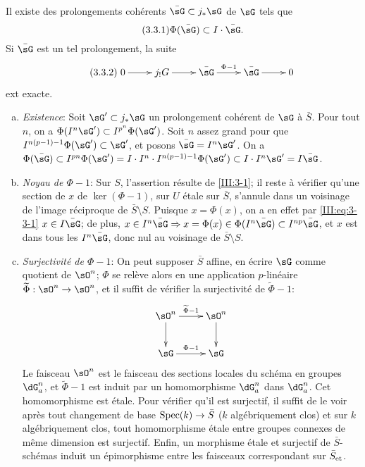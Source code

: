 \begin{lemma_}\label{III:3-3}
Il existe des prolongements cohérents $\bar\sG\subset j_*\sG$ de $\sG$ tels 
que 
\begin{equation*}\tag{3.3.1}\label{III:eq:3-3-1}
  \Phi(\bar\sG)\subset I\cdot \bar\sG\text{.}
\end{equation*}
Si $\bar\sG$ est un tel prolongement, la suite 
\begin{equation*}\tag{3.3.2}\label{III:eq:3-3-2}
\xymatrix{
  0 \ar[r] 
    & j_! G \ar[r] 
    & \bar\sG \ar[r]^-{\Phi-1} 
    & \bar\sG \ar[r] 
    & 0
}
\end{equation*}
ext exacte.
\end{lemma_}
\begin{enumerate}[a)]
  \item \emph{Existence}: Soit $\sG'\subset j_*\sG$ un prolongement cohérent 
    de $\sG$ à $\bar S$. Pour tout $n$, on a 
    $\Phi(I^n \sG')\subset I^{p^n}\Phi(\sG')$. Soit $n$ assez grand pour 
    que $I^{n(p-1)-1}\Phi(\sG')\subset \sG'$, et posons $\bar\sG=I^n\sG'$. 
    On a $\Phi(\bar\sG)\subset I^{p n}\Phi(\sG') 
    =I\cdot I^n\cdot I^{n(p-1)-1}\Phi(\sG')\subset I\cdot I^n\sG' 
    = I\bar\sG$. 
  \item \emph{Noyau de $\Phi-1$}: Sur $S$, l'assertion résulte de 
    \ref{III:3-1}; il reste à vérifier qu'une section de $x$ de 
    $\ker(\Phi-1)$, sur $U$ étale sur $\bar S$, s'annule dans un voisinage de 
    l'image réciproque de $\bar S\setminus S$. Puisque $x=\Phi(x)$, on a en 
    effet par \eqref{III:eq:3-3-1} $x\in I\bar\sG$; de plus, 
    $x\in I^n\bar\sG\Rightarrow x=\Phi(x)\in\Phi(I^n\bar\sG)\subset I^{n p}\bar\sG$, et $x$ est dans tous les $I^n\bar\sG$, donc nul au voisinage de 
    $\bar S\setminus S$.
  \item \emph{Surjectivité de $\Phi-1$}: On peut supposer $\bar S$ affine, en 
    écrire $\sG$ comme quotient de $\sO^n$; $\Phi$ se relève alors en une 
    application $p$-linéaire $\widetilde\Phi:\sO^n\to\sO^n$, et il suffit de 
    vérifier la surjectivité de $\widetilde\Phi-1$:
    \[\xymatrix{
      \sO^n \ar[r]^-{\widetilde \Phi-1} \ar[d] 
        & \sO^n \ar[d] \\
      \sG \ar[r]^-{\Phi-1} 
        & \sG 
    }\]
    Le faisceau $\sO^n$ est le faisceau des sections locales du schéma en 
    groupes $\dG_a^n$, et $\widetilde\Phi-1$ est induit par un homomorphisme 
    $\dG_a^n$ dans $\dG_a^n$. Cet homomorphisme est étale. Pour vérifier 
    qu'il est surjectif, il suffit de le voir après tout changement de base 
    $\operatorname{Spec}(k)\to\bar S$ ($k$ algébriquement clos) et sur $k$ algébriquement 
    clos, tout homomorphisme étale entre groupes connexes de même dimension 
    est surjectif. Enfin, un morphisme étale et surjectif de 
    $\bar S$-schémas induit un épimorphisme entre les faisceaux 
    correspondant sur ${\bar S}_{\textnormal{et}}$.
\end{enumerate}





